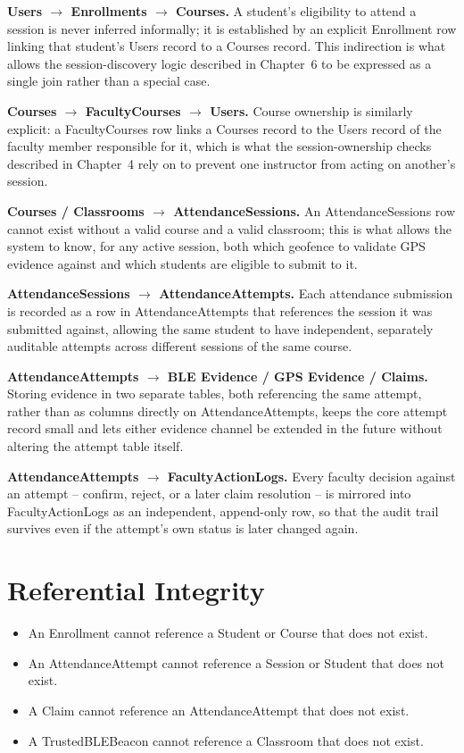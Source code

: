\documentclass[12pt, a4paper, oneside]{report}
\begin{document}
\noindent\textbf{Users $\rightarrow$ Enrollments $\rightarrow$ Courses.} A student's eligibility to attend a session is never inferred informally; it is established by an explicit Enrollment row linking that student's Users record to a Courses record. This indirection is what allows the session-discovery logic described in Chapter~6 to be expressed as a single join rather than a special case.

\noindent\textbf{Courses $\rightarrow$ FacultyCourses $\rightarrow$ Users.} Course ownership is similarly explicit: a FacultyCourses row links a Courses record to the Users record of the faculty member responsible for it, which is what the session-ownership checks described in Chapter~4 rely on to prevent one instructor from acting on another's session.

\noindent\textbf{Courses / Classrooms $\rightarrow$ AttendanceSessions.} An AttendanceSessions row cannot exist without a valid course and a valid classroom; this is what allows the system to know, for any active session, both which geofence to validate GPS evidence against and which students are eligible to submit to it.

\noindent\textbf{AttendanceSessions $\rightarrow$ AttendanceAttempts.} Each attendance submission is recorded as a row in AttendanceAttempts that references the session it was submitted against, allowing the same student to have independent, separately auditable attempts across different sessions of the same course.

\noindent\textbf{AttendanceAttempts $\rightarrow$ BLE Evidence / GPS Evidence / Claims.} Storing evidence in two separate tables, both referencing the same attempt, rather than as columns directly on AttendanceAttempts, keeps the core attempt record small and lets either evidence channel be extended in the future without altering the attempt table itself.

\noindent\textbf{AttendanceAttempts $\rightarrow$ FacultyActionLogs.} Every faculty decision against an attempt -- confirm, reject, or a later claim resolution -- is mirrored into FacultyActionLogs as an independent, append-only row, so that the audit trail survives even if the attempt's own status is later changed again.

\section{Referential Integrity}
\begin{itemize}
    \item An Enrollment cannot reference a Student or Course that does not exist.
    \item An AttendanceAttempt cannot reference a Session or Student that does not exist.
    \item A Claim cannot reference an AttendanceAttempt that does not exist.
    \item A TrustedBLEBeacon cannot reference a Classroom that does not exist.
\end{itemize}
\end{document}

